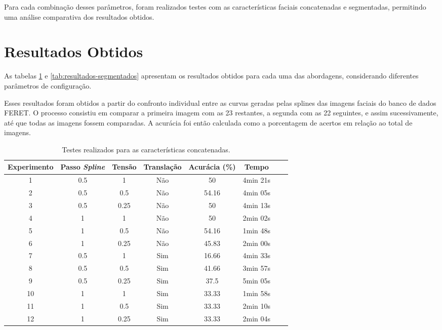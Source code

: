 Para cada combinação desses parâmetros, foram realizados testes com as características faciais concatenadas e segmentadas, permitindo uma análise comparativa dos resultados obtidos.

\section{Resultados Obtidos}

 As tabelas \ref{tab:resultados-concatenados} e \ref{tab:resultados-segmentados} apresentam os resultados obtidos para cada uma das abordagens, considerando diferentes parâmetros de configuração.

Esses resultados foram obtidos a partir do confronto individual entre as curvas geradas pelas splines das imagens faciais do banco de dados FERET. O processo consistiu em comparar a primeira imagem com as 23 restantes, a segunda com as 22 seguintes, e assim sucessivamente, até que todas as imagens fossem comparadas. A acurácia foi então calculada como a porcentagem de acertos em relação ao total de imagens.

\begin{table}[h!]
    \centering
    \caption{Testes realizados para as características concatenadas.}
    \begin{tabular}{|c|c|c|c|c|c|c|c|}
    \hline
    \textbf{Experimento} & \textbf{Passo \textit{Spline}} & \textbf{Tensão} & \textbf{Translação} & \textbf{Acurácia (\%)} & \textbf{Tempo} \\
    \hline
    1 & 0.5 & 1 & Não & 50 & 4min 21s\\
    2 & 0.5 & 0.5 & Não & 54.16 & 4min 05s\\
    3 & 0.5 & 0.25 & Não & 50 & 4min 13s\\

    4 & 1 & 1 & Não & 50 & 2min 02s\\
    5 & 1 & 0.5 & Não & 54.16 & 1min 48s\\
    6 & 1 & 0.25 & Não & 45.83 & 2min 00s\\

    7 & 0.5 & 1 & Sim & 16.66 & 4min 33s \\
    8 & 0.5 & 0.5 & Sim & 41.66 & 3min 57s \\
    9 & 0.5 & 0.25 & Sim & 37.5 & 5min 05s\\
 
    10 & 1 & 1 & Sim & 33.33 & 1min 58s \\
    11 & 1 & 0.5 & Sim & 33.33 & 2min 10s \\
    12 & 1 & 0.25 & Sim & 33.33 & 2min 04s \\
    \hline
    \end{tabular}
    \label{tab:resultados-concatenados}
\end{table}

